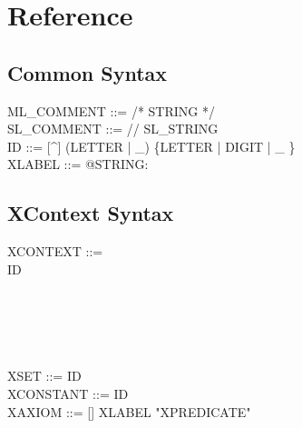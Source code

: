 \section{Reference}
\label{sec:reference}

\subsection{Common Syntax}
\label{sec:common-syntax}
\begin{center}
  \begin{Bcode}
ML_COMMENT ::= /* STRING */\\
SL_COMMENT ::= // SL_STRING \\
ID ::= [^] (LETTER | \_) \{LETTER | DIGIT | \_ \}\\
XLABEL ::= @STRING:\\
  \end{Bcode}
\end{center}


\subsection{XContext Syntax}
\label{sec:xcontext-syntax}

\begin{center}
  \begin{Bcode}
    XCONTEXT ::= \\
    \Btab \Btab \Bcontext{} ID \\
    \Btab \Btab [\Bextends{} ID \{ ID \}]\\
    \Btab {}\\
    \Btab {}\\
    \Btab {}\\[2ex]
    \Btab \Btab \Bend\\
    XSET ::= ID \\
    XCONSTANT ::= ID \\
    XAXIOM ::= [\Btheorem] XLABEL "XPREDICATE" \\
  \end{Bcode}
\end{center}

